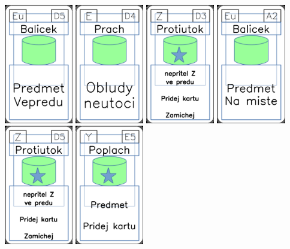 \documentclass[a4paper]{article}
\begin{document}
	\includegraphics[width=3.0cm]{img-4_19}
	\includegraphics[width=3.0cm]{img-4_48}
	\includegraphics[width=3.0cm]{img-5_47}
	\includegraphics[width=3.0cm]{img-4_31}
	\includegraphics[width=3.0cm]{img-5_49}
	\includegraphics[width=3.0cm]{img-5_24}
\end{document}
